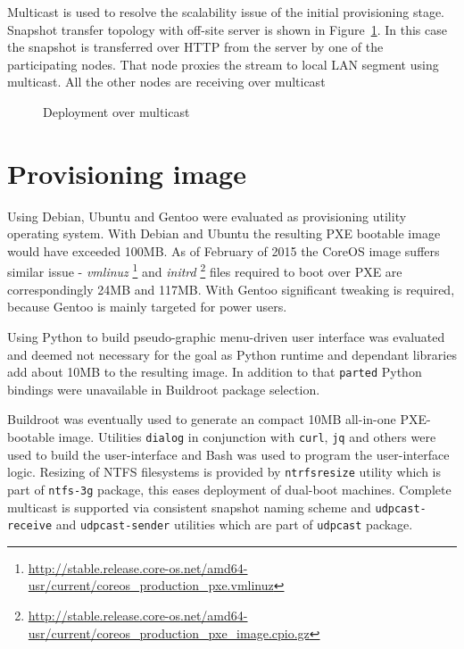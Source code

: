 \documentclass[a4paper,11pt]{kth-mag}
\begin{document}
Multicast is used to resolve the scalability issue of
the initial provisioning stage.
Snapshot transfer topology with off-site
server is shown in Figure~\ref{fig:butterknife-usecase-multicast}.
In this case the snapshot is transferred over HTTP from
the server by one of the participating nodes.
That node proxies the stream to local LAN segment using multicast.
All the other nodes are receiving over multicast

\begin{figure}[!htb]
\centering
\scalebox{0.5}{}
\caption{Deployment over multicast}
\label{fig:butterknife-usecase-multicast}
\end{figure}


\clearpage

\section{Provisioning image}

Using Debian, Ubuntu and Gentoo were evaluated as provisioning utility
operating system. With Debian and Ubuntu the resulting PXE bootable image
would have exceeded 100MB.
As of February of 2015 the CoreOS image suffers similar issue -
\emph{vmlinuz}
\footnote{\url{http://stable.release.core-os.net/amd64-usr/current/coreos_production_pxe.vmlinuz}}
and
\emph{initrd}
\footnote{\url{http://stable.release.core-os.net/amd64-usr/current/coreos_production_pxe_image.cpio.gz}}
files required to boot over PXE are correspondingly 24MB and 117MB.
With Gentoo significant tweaking is required, because Gentoo is
mainly targeted for power users.

Using Python to build pseudo-graphic menu-driven user interface was
evaluated and deemed not necessary for the goal as Python runtime and
dependant libraries add about 10MB to the resulting image.
In addition to that \texttt{parted} Python bindings were unavailable
in Buildroot package selection.

Buildroot was eventually used to generate an compact 10MB all-in-one
PXE-bootable image. Utilities \texttt{dialog} in conjunction with
\texttt{curl}, \texttt{jq} and others were used to build the user-interface
and Bash was used to program the user-interface logic.
Resizing of NTFS filesystems is provided by \texttt{ntrfsresize} utility
which is part of \texttt{ntfs-3g} package, this eases deployment of
dual-boot machines.
Complete multicast is supported via consistent snapshot naming scheme
and \texttt{udpcast-receive} and \texttt{udpcast-sender} utilities which
are part of \texttt{udpcast} package.
\end{document}
